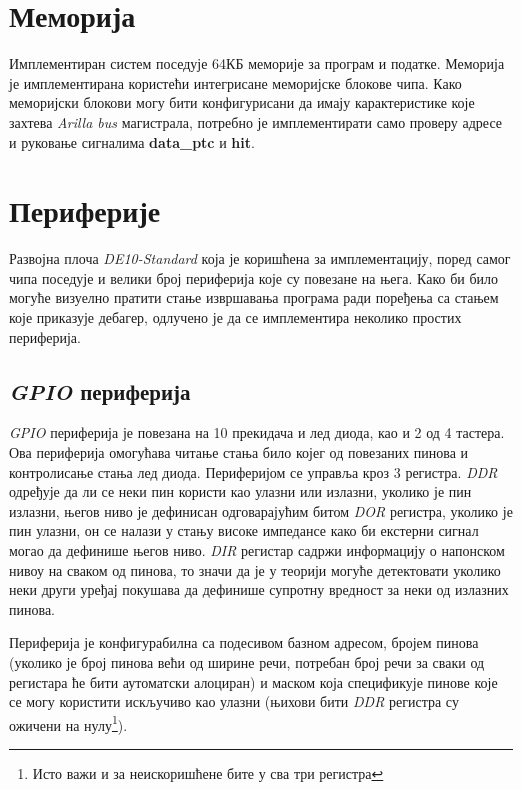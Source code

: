 \section{Меморија}

Имплементиран систем поседује 64КБ меморије за програм и податке. Меморија је имплементирана користећи интегрисане меморијске блокове  чипа. Како меморијски блокови могу бити конфигурисани да имају карактеристике које захтева \textit{Arilla bus} магистрала, потребно је имплементирати само проверу адресе и руковање сигналима \textbf{data\_ptc} и \textbf{hit}.

\section{Периферије}

Развојна плоча \textit{DE10-Standard}\cite{de10} која је коришћена за имплементацију, поред самог  чипа поседује и велики број периферија које су повезане на њега. Како би било могуће визуелно пратити стање извршавања програма ради поређења са стањем које приказује дебагер, одлучено је да се имплементира неколико простих периферија.

\subsection{\textit{\acrshort{GPIO}} периферија}

\textit{\acrfull{GPIO}} периферија је повезана на 10 прекидача и лед диода, као и 2 од 4 тастера. Ова периферија омогућава читање стања било којег од повезаних пинова и контролисање стања лед диода. Периферијом се управља кроз 3 регистра. \textit{\acrfull{DDR}} одређује да ли се неки пин користи као улазни или излазни, уколико је пин излазни, његов ниво је дефинисан одговарајућим битом \textit{\acrfull{DOR}} регистра, уколико је пин улазни, он се налази у стању високе импедансе како би екстерни сигнал могао да дефинише његов ниво. \textit{\acrfull{DIR}} регистар садржи информацију о напонском нивоу на сваком од пинова, то значи да је у теорији могуће детектовати уколико неки други уређај покушава да дефинише супротну вредност за неки од излазних пинова.



Периферија је конфигурабилна са подесивом базном адресом, бројем пинова (уколико је број пинова већи од ширине речи, потребан број речи за сваки од регистара ће бити аутоматски алоциран) и маском која спецификује пинове које се могу користити искључиво као улазни (њихови бити \textit{\acrshort{DDR}} регистра су ожичени на нулу\footnote{Исто важи и за неискоришћене бите у сва три регистра}).

